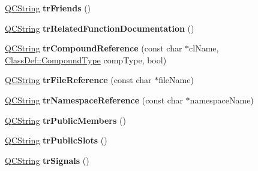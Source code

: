 \begin{DoxyCompactItemize}
\item 
\hypertarget{class_translator_slovene_a09300dedef1bc1ce5c2de5d70e6051bf}{\hyperlink{class_q_c_string}{Q\-C\-String} {\bfseries tr\-Friends} ()}\label{class_translator_slovene_a09300dedef1bc1ce5c2de5d70e6051bf}

\item 
\hypertarget{class_translator_slovene_ae97d87449f2ff86c736e70fdeb6c2534}{\hyperlink{class_q_c_string}{Q\-C\-String} {\bfseries tr\-Related\-Function\-Documentation} ()}\label{class_translator_slovene_ae97d87449f2ff86c736e70fdeb6c2534}

\item 
\hypertarget{class_translator_slovene_ad67d959a4f34a4e4038c62428001654c}{\hyperlink{class_q_c_string}{Q\-C\-String} {\bfseries tr\-Compound\-Reference} (const char $\ast$cl\-Name, \hyperlink{class_class_def_a768a6f0a6fd7e9087ff7971abbcc3f36}{Class\-Def\-::\-Compound\-Type} comp\-Type, bool)}\label{class_translator_slovene_ad67d959a4f34a4e4038c62428001654c}

\item 
\hypertarget{class_translator_slovene_ab665cdc5cebda16bb4acbdc62718a2ba}{\hyperlink{class_q_c_string}{Q\-C\-String} {\bfseries tr\-File\-Reference} (const char $\ast$file\-Name)}\label{class_translator_slovene_ab665cdc5cebda16bb4acbdc62718a2ba}

\item 
\hypertarget{class_translator_slovene_a8afd00694e0e220867c090eecfdd861a}{\hyperlink{class_q_c_string}{Q\-C\-String} {\bfseries tr\-Namespace\-Reference} (const char $\ast$namespace\-Name)}\label{class_translator_slovene_a8afd00694e0e220867c090eecfdd861a}

\item 
\hypertarget{class_translator_slovene_a21c92afb604c94e0636482e72081e182}{\hyperlink{class_q_c_string}{Q\-C\-String} {\bfseries tr\-Public\-Members} ()}\label{class_translator_slovene_a21c92afb604c94e0636482e72081e182}

\item 
\hypertarget{class_translator_slovene_a9ea325858f846bec828dadd21d58ec0f}{\hyperlink{class_q_c_string}{Q\-C\-String} {\bfseries tr\-Public\-Slots} ()}\label{class_translator_slovene_a9ea325858f846bec828dadd21d58ec0f}

\item 
\hypertarget{class_translator_slovene_a5b7fb21c5120618a98594bc60c956185}{\hyperlink{class_q_c_string}{Q\-C\-String} {\bfseries tr\-Signals} ()}\label{class_translator_slovene_a5b7fb21c5120618a98594bc60c956185}


\end{DoxyCompactItemize}
